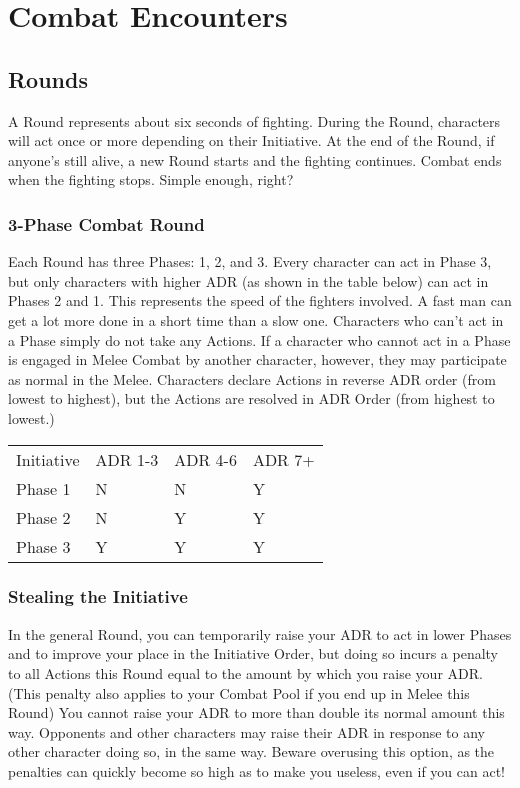 \documentclass[oneside,11pt,english]{book}
\begin{document}
\section{Combat Encounters}
\subsection{Rounds}
A Round represents about six seconds of fighting. During the Round, characters will act once or more
depending on their Initiative. At the end of the Round, if anyone’s still alive, a new Round starts and the
fighting continues. Combat ends when the fighting stops. Simple enough, right?
\subsubsection{3-Phase Combat Round}
Each Round has three Phases: 1, 2, and 3. Every character can act in Phase 3, but only characters with
higher ADR (as shown in the table below) can act in Phases 2 and 1. This represents the speed of the
fighters involved. A fast man can get a lot more done in a short time than a slow one. Characters who
can’t act in a Phase simply do not take any Actions. If a character who cannot act in a Phase is engaged in
Melee Combat by another character, however, they may participate as normal in the Melee.
Characters declare Actions in reverse ADR order (from lowest to highest), but the Actions are resolved in
ADR Order (from highest to lowest.)

\begin{tabu} spread 0pt {X[2,l] *{3}{X}}
	Initiative&ADR 1-3&ADR 4-6&ADR 7+\\
	Phase 1&  	N  &	N & 	Y\\
	Phase 2&  	N  &	Y & 	Y\\
	Phase 3&  	Y  &	Y & 	Y\\
\end{tabu}

\subsubsection{Stealing the Initiative}
In the general Round, you can temporarily raise your ADR to act in lower Phases and to improve your
place in the Initiative Order, but doing so incurs a penalty to all Actions this Round equal to the amount
by which you raise your ADR. (This penalty also applies to your Combat Pool if you end up in Melee this
Round) You cannot raise your ADR to more than double its normal amount this way. Opponents and
other characters may raise their ADR in response to any other character doing so, in the same way.
Beware overusing this option, as the penalties can quickly become so high as to make you useless, even if
you can act!
\end{document}
